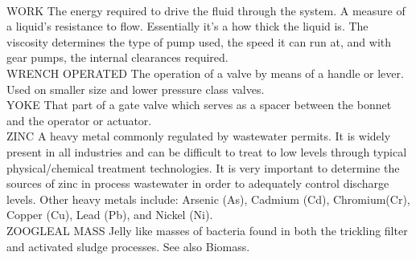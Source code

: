 \vspace{0.3cm}\\
WORK
The energy required to drive the fluid through the system.  A measure of a liquid’s resistance to flow. Essentially it’s a how thick the liquid is. The viscosity determines the type of pump used, the speed it can run at, and with gear pumps, the internal clearances required.
\vspace{0.3cm}\\
WRENCH OPERATED
The operation of a valve by means of a handle or lever. Used on smaller size and lower pressure class valves.
\vspace{0.3cm}\\
YOKE
That part of a gate valve which serves as a spacer between the bonnet and the operator or actuator.
\vspace{0.3cm}\\
ZINC
A heavy metal commonly regulated by wastewater permits. It is widely present in all industries and can be difficult to treat to low levels through typical physical/chemical treatment technologies.  It is very important to determine the sources of zinc in process wastewater in order to adequately control discharge levels.  Other heavy metals include: Arsenic (As), Cadmium (Cd), Chromium(Cr), Copper (Cu), Lead (Pb), and Nickel (Ni).
\vspace{0.3cm}\\
ZOOGLEAL MASS
Jelly like masses of bacteria found in both the trickling filter and activated sludge processes. See also Biomass.
\vspace{0.3cm}\\










